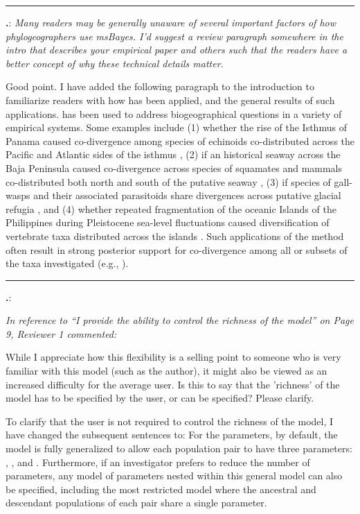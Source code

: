 \documentclass[12pt]{article}
\newcounter{commentCounter}
\newcommand{\revcomment}[1]{{\addtocounter{commentCounter}{1}}
    \medskip \hrule \noindent
\textbf{\arabic{section}.\arabic{commentCounter}}: {\sl #1}\par\xspace}
\newcommand{\response}[1]{{\addtolength{\leftskip}{0.25in} #1\par}\xspace}
\let\quoteOld\quote
\let\endquoteOld\endquote
\renewenvironment{quote}{\sffamily\small\quoteOld}{\endquoteOld}
\begin{document}
\revcomment{
    Many readers may be generally unaware of several important factors of how
    phylogeographers use msBayes. I'd suggest a review paragraph somewhere in
    the intro that describes your empirical paper and others such that the
    readers have a better concept of why these technical details matter.
}
\response{
    Good point. I have added the following paragraph to the introduction to
    familiarize readers with how \msb has been applied, and the general results
    of such applications.
    \begin{quote}
        \msb has been used to address biogeographical questions in a variety of
        empirical systems. Some examples include (1) whether the rise of the
        Isthmus of Panama caused co-divergence among species of echinoids
        co-distributed across the Pacific and Atlantic sides of the isthmus
        \cite{Hickerson2006}, (2) if an historical seaway across the Baja
        Peninsula caused co-divergence across species of squamates and mammals
        co-distributed both north and south of the putative seaway
        \cite{Leache2007}, (3) if species of gall-wasps and their associated
        parasitoids share divergences across putative glacial refugia
        \cite{Stone2012}, and (4) whether repeated fragmentation of the oceanic
        Islands of the Philippines during Pleistocene sea-level fluctuations
        caused diversification of vertebrate taxa distributed across the
        islands \cite{Oaks2012}.  Such applications of the method often result
        in strong posterior support for co-divergence among all or subsets of
        the taxa investigated (e.g.,
        \cite{Barber2010,Carnaval2009,Chan2011,Hickerson2006,Leache2007,Plouviez2009,Stone2012,Voje2009,Oaks2012}).
    \end{quote}
}

\revcomment{
    In reference to ``I provide the ability to control the richness of the model'' on Page 9,
    Reviewer 1 commented:

    While I appreciate how this flexibility is a selling point to someone who
    is very familiar with this model (such as the author), it might also be
    viewed as an increased difficulty for the average user. Is this to say that
    the 'richness' of the model has to be specified by the user, or can be
    specified? Please clarify.
}
\response{
    To clarify that the user is not required to control the richness of the
    model, I have changed the subsequent sentences to:
    \begin{quote}
        For the \myTheta{} parameters, by default, the model is fully
        generalized to allow each population pair to have three parameters:
        \ancestralTheta{}, \descendantTheta{1}{}, and \descendantTheta{2}{}.
        Furthermore, if an investigator prefers to reduce the number of
        parameters, any model of \myTheta{} parameters nested within this
        general model can also be specified, including the most restricted
        model where the ancestral and descendant populations of each pair share
        a single \myTheta{} parameter.
    \end{quote}
}
\end{document}
